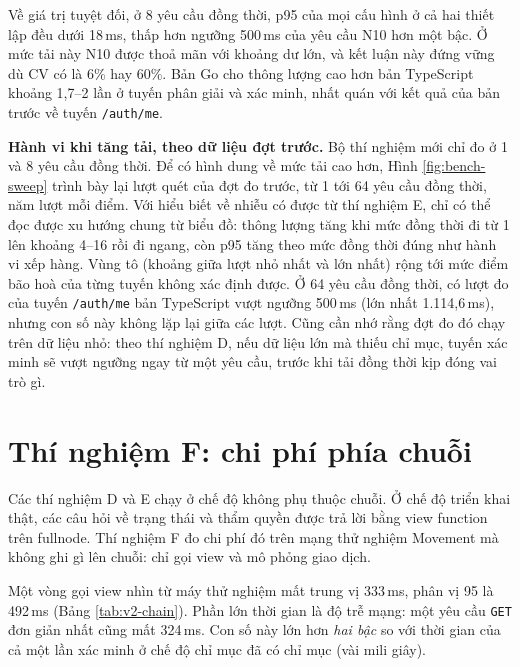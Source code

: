 

Về giá trị tuyệt đối, ở 8 yêu cầu đồng thời, p95 của mọi cấu hình ở cả hai thiết lập đều dưới 18\,ms, thấp hơn ngưỡng 500\,ms của yêu cầu N10 hơn một bậc. Ở mức tải này N10 được thoả mãn với khoảng dư lớn, và kết luận này đứng vững dù CV có là 6\% hay 60\%. Bản Go cho thông lượng cao hơn bản TypeScript khoảng 1,7--2 lần ở tuyến phân giải và xác minh, nhất quán với kết quả của bản trước về tuyến \texttt{/auth/me}.

\textbf{Hành vi khi tăng tải, theo dữ liệu đợt trước.} Bộ thí nghiệm mới chỉ đo ở 1 và 8 yêu cầu đồng thời. Để có hình dung về mức tải cao hơn, Hình \ref{fig:bench-sweep} trình bày lại lượt quét của đợt đo trước, từ 1 tới 64 yêu cầu đồng thời, năm lượt mỗi điểm. Với hiểu biết về nhiễu có được từ thí nghiệm E, chỉ có thể đọc được xu hướng chung từ biểu đồ: thông lượng tăng khi mức đồng thời đi từ 1 lên khoảng 4--16 rồi đi ngang, còn p95 tăng theo mức đồng thời đúng như hành vi xếp hàng. Vùng tô (khoảng giữa lượt nhỏ nhất và lớn nhất) rộng tới mức điểm bão hoà của từng tuyến không xác định được. Ở 64 yêu cầu đồng thời, có lượt đo của tuyến \texttt{/auth/me} bản TypeScript vượt ngưỡng 500\,ms (lớn nhất 1.114,6\,ms), nhưng con số này không lặp lại giữa các lượt. Cũng cần nhớ rằng đợt đo đó chạy trên dữ liệu nhỏ: theo thí nghiệm D, nếu dữ liệu lớn mà thiếu chỉ mục, tuyến xác minh sẽ vượt ngưỡng ngay từ một yêu cầu, trước khi tải đồng thời kịp đóng vai trò gì.



\section{Thí nghiệm F: chi phí phía chuỗi}
\label{sec:tn-chain}

Các thí nghiệm D và E chạy ở chế độ không phụ thuộc chuỗi. Ở chế độ triển khai thật, các câu hỏi về trạng thái và thẩm quyền được trả lời bằng view function trên fullnode. Thí nghiệm F đo chi phí đó trên mạng thử nghiệm Movement mà không ghi gì lên chuỗi: chỉ gọi view và mô phỏng giao dịch.



Một vòng gọi view nhìn từ máy thử nghiệm mất trung vị 333\,ms, phân vị 95 là 492\,ms (Bảng \ref{tab:v2-chain}). Phần lớn thời gian là độ trễ mạng: một yêu cầu \texttt{GET} đơn giản nhất cũng mất 324\,ms. Con số này lớn hơn \emph{hai bậc} so với thời gian của cả một lần xác minh ở chế độ chỉ mục đã có chỉ mục (vài mili giây).

